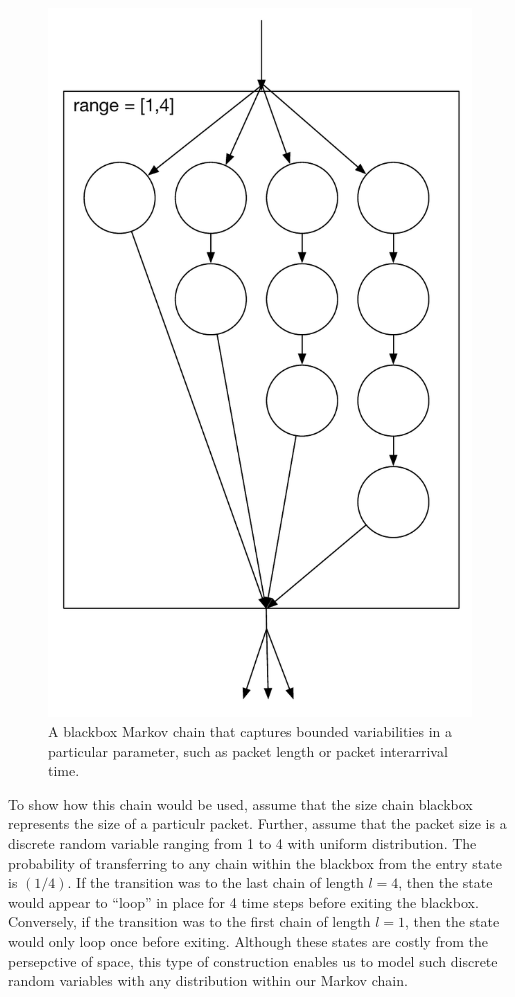 \documentclass{llncs}
\begin{document}
\begin{figure}
\begin{center}
\includegraphics[scale=0.35]{../../sketches/size_chain_old.pdf}
\caption{A blackbox Markov chain that captures bounded variabilities in a particular parameter, such as packet length or packet interarrival time.}
\label{fig:size_chain}
\end{center}
\end{figure}

To show how this chain would be used, assume that the size chain blackbox represents the size of a particulr packet. Further, assume that the packet size is a discrete random variable ranging from 1 to 4 with uniform distribution. The probability of transferring to any chain within the blackbox from the entry state is $(1/4)$. If the transition was to the last chain of length $l = 4$, then the state would appear to ``loop'' in place for 4 time steps before exiting the blackbox. Conversely, if the transition was to the first chain of length $l = 1$, then the state would only loop once before exiting. Although these states are costly from the persepctive of space, this type of construction enables us to model such discrete random variables with any distribution within our Markov chain. 
\end{document}
